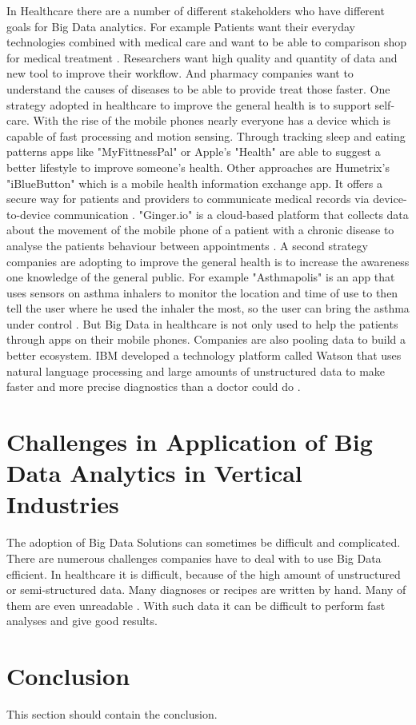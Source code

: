 \documentclass[runningheads]{llncs}
\begin{document}
In Healthcare there are a number of different stakeholders who have different goals for Big Data analytics. For example Patients want their everyday technologies combined with medical care and want to be able to comparison shop for medical treatment \cite{FELDMAN}. Researchers want high quality and quantity of data and new tool to improve their workflow. And pharmacy companies want to understand the causes of diseases to be able to provide treat those faster.
One strategy adopted in healthcare to improve the general health is to support self-care. With the rise of the mobile phones nearly everyone has a device which is capable of fast processing and motion sensing. Through tracking sleep and eating patterns apps like "MyFittnessPal" or Apple's "Health"  are able to suggest a better lifestyle to improve someone's health. Other approaches are Humetrix's "iBlueButton" which is a mobile health information exchange app. It offers a secure way for patients and providers to communicate medical records via device-to-device communication \cite{FELDMAN}. "Ginger.io" is a cloud-based platform that collects data about the movement of the mobile phone of a patient with a chronic disease to analyse the patients behaviour between appointments \cite{FELDMAN}. A second strategy companies are adopting to improve the general health is to increase the awareness one knowledge of the general public. For example "Asthmapolis" is an app that uses sensors on asthma inhalers to monitor the location and time of use to then tell the user where he used the inhaler the most, so the user can bring the asthma under control \cite{FELDMAN}. But Big Data in healthcare is not only used to help the patients through apps on their mobile phones. Companies are also pooling data to build a better ecosystem. IBM developed a technology platform called Watson that uses natural language processing and large amounts of unstructured data to make faster and more precise diagnostics than a doctor could do \cite{WATSON}.

\section{Challenges in Application of Big Data Analytics in Vertical Industries}
The adoption of Big Data Solutions can sometimes be difficult and complicated. There are numerous challenges companies have to deal with to use Big Data efficient. In healthcare it is difficult, because of the high amount of unstructured or semi-structured data. Many diagnoses or recipes are written by hand. Many of them are even unreadable \cite{FELDMAN}. With such data it can be difficult to perform fast analyses and give good results.

\section{Conclusion}
This section should contain the conclusion.


\end{document}
